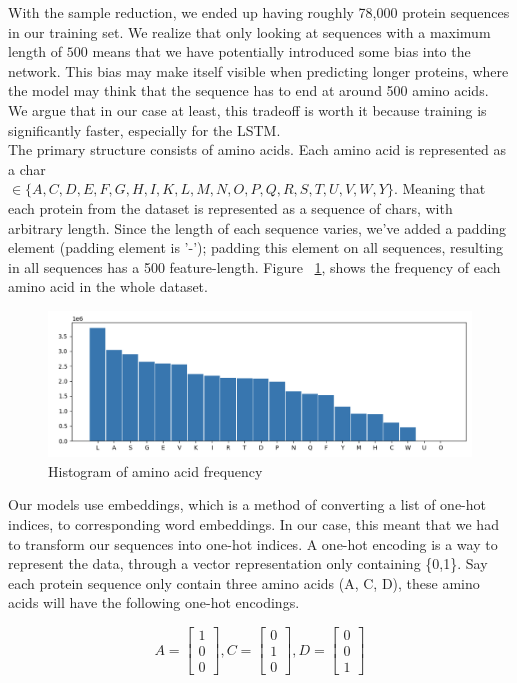 \noindent
With the sample reduction, we ended up having roughly 78,000 protein sequences in our training set. We realize that only looking at sequences with a maximum length of $500$ means that we have potentially introduced some bias into the network. This bias may make itself visible when predicting longer proteins, where the model may think that the sequence has to end at around 500 amino acids. We argue that in our case at least, this tradeoff is worth it because training is significantly faster, especially for the LSTM.\\

\noindent
The primary structure consists of amino acids. Each amino acid is represented as a char \\ $\in \{A, C, D, E, F, G, H, I, K, L, M, N, O, P, Q, R, S, T, U, V, W, Y\}$. Meaning that each protein from the dataset is represented as a sequence of chars, with arbitrary length. Since the length of each sequence varies, we've added a padding element (padding element is '-'); padding this element on all sequences, resulting in all sequences has a 500 feature-length. Figure ~\ref{fig:before}, shows the frequency of each amino acid in the whole dataset.\\

\begin{figure}[!ht]
  \centering
  \includegraphics[scale=0.4]{latex/imgs/aminoFreq.png}
  \caption{Histogram of amino acid frequency}\label{fig:before}
\end{figure}

\noindent
Our models use embeddings, which is a method of converting a list of one-hot indices, to corresponding word embeddings. In our case, this meant that we had to transform our sequences into one-hot indices. A one-hot encoding is a way to represent the data, through a vector representation only containing \{0,1\}. Say each protein sequence only contain three amino acids (A, C, D), these amino acids will have the following one-hot encodings.

$$
A = \begin{bmatrix}
1 \\
0 \\
0
\end{bmatrix},
C = \begin{bmatrix}
0 \\
1 \\
0
\end{bmatrix},
D= \begin{bmatrix}
0 \\
0 \\
1
\end{bmatrix}
$$

